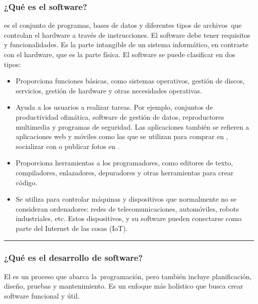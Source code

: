 \documentclass[letterpaper,10pt,spanish]{sphinxmanual}
\begin{document}
\subsubsection{¿Qué es el software?}
\label{\detokenize{1_guias/10programacion/G1021:que-es-el-software}}
\sphinxAtStartPar
{} es el conjunto de programas, bases de datos y diferentes tipos de archivos que controlan el hardware a través de instrucciones. El software debe tener requisitos y funcionalidades. Es la parte intangible de un sistema informático, en contraste con el hardware, que es la parte física. El software se puede clasificar en dos tipos:
\begin{itemize}
\item {} 
\sphinxAtStartPar
{} Proporciona funciones básicas, como sistemas operativos, gestión de discos, servicios, gestión de hardware y otras necesidades operativas.

\item {} 
\sphinxAtStartPar
{} Ayuda a los usuarios a realizar tareas. Por ejemplo, conjuntos de productividad ofimática, software de gestión de datos, reproductores multimedia y programas de seguridad. Las aplicaciones también se refieren a aplicaciones web y móviles como las que se utilizan para comprar en , socializar con  o publicar fotos en .

\item {} 
\sphinxAtStartPar
{} Proporciona herramientas a los programadores, como editores de texto, compiladores, enlazadores, depuradores y otras herramientas para crear código.

\item {} 
\sphinxAtStartPar
{} Se utiliza para controlar máquinas y dispositivos que normalmente no se consideran ordenadores: redes de telecomunicaciones, automóviles, robots industriales, etc. Estos dispositivos, y su software pueden conectarse como parte del Internet de las cosas (IoT).

\end{itemize}


\bigskip\hrule\bigskip



\subsubsection{¿Qué es el desarrollo de software?}
\label{\detokenize{1_guias/10programacion/G1021:que-es-el-desarrollo-de-software}}
\sphinxAtStartPar
El  es un proceso que abarca la programación, pero también incluye planificación, diseño, pruebas y mantenimiento. Es un enfoque más holístico que busca crear software funcional y útil.
\end{document}
